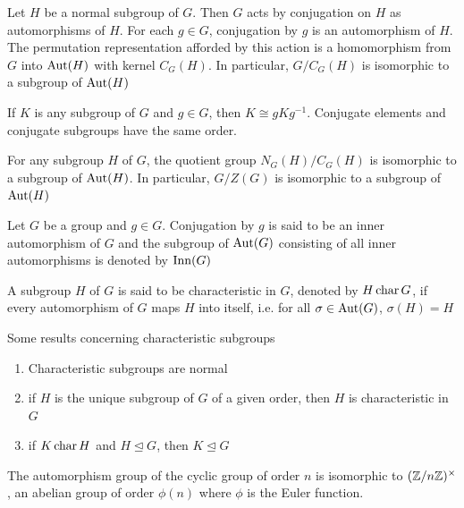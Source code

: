 \begin{proposition}
	Let $H$ be a normal subgroup of $G$. Then $G$ acts by conjugation on $H$ as automorphisms of $H$. For each $g \in G$, conjugation by $g$ is an automorphism of $H$. The permutation representation afforded by this action is a homomorphism from $G$ into $\operatorname{Aut}(H)$ with kernel $C_G(H)$. In particular, $G / C_G(H)$ is isomorphic to a subgroup of $\operatorname{Aut}(H)$
\end{proposition}

\begin{corollary}
	If $K$ is any subgroup of $G$ and $g \in G$, then $K \cong gKg^{-1}$. Conjugate elements and conjugate subgroups have the same order.
\end{corollary}

\begin{corollary}
	For any subgroup $H$ of $G$, the quotient group $N_G(H) / C_G(H)$ is isomorphic to a subgroup of $\operatorname{Aut}(H)$. In particular, $G/Z(G)$ is isomorphic to a subgroup of $\operatorname{Aut}(H)$
\end{corollary}

\begin{definition}
	Let $G$ be a group and $g \in G$. Conjugation by $g$ is said to be an inner automorphism of $G$ and the subgroup of $\operatorname{Aut}(G)$ consisting of all inner automorphisms is denoted by $\operatorname{Inn}(G)$
\end{definition}

\begin{definition}[Characteristic]
	A subgroup $H$ of $G$ is said to be characteristic in $G$, denoted by $H \operatorname{char} G$, if every automorphism of $G$ maps $H$ into itself, i.e. for all $\sigma \in \operatorname{Aut}(G)$, $\sigma(H) = H$
\end{definition}

\begin{proposition}
	Some results concerning characteristic subgroups
	\begin{enumerate}
		\item Characteristic subgroups are normal
		\item if $H$ is the unique subgroup of $G$ of a given order, then $H$ is characteristic in $G$
		\item if $K \operatorname{char} H$ and $H \trianglelefteq G$, then $K \trianglelefteq G$
	\end{enumerate}
\end{proposition}

\begin{proposition}
	The automorphism group of the cyclic group of order $n$ is isomorphic to $(\mathbb{Z} / n\mathbb{Z})^\times$, an abelian group of order $\phi(n)$ where $\phi$ is the Euler function.
\end{proposition}

